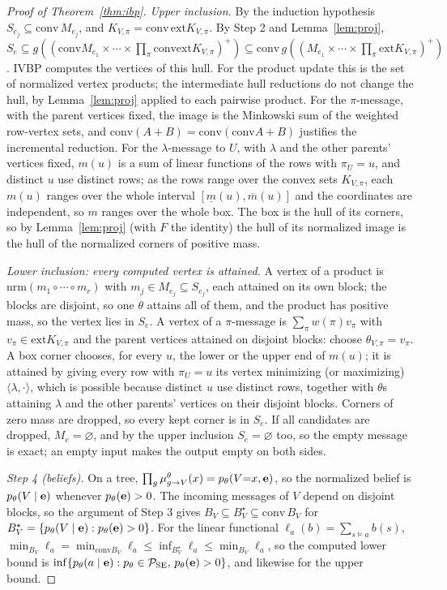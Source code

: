 \documentclass{article} %
\newcommand{\ext}{\mathrm{ext}}
\begin{document}
\begin{proof}[Proof of Theorem~\ref{thm:ibp}]
\emph{Upper inclusion.} By the induction hypothesis $S_{e_j}\subseteq\mathrm{conv}\,M_{e_j}$,
and $K_{V,\pi}=\mathrm{conv}\,\ext K_{V,\pi}$. By Step 2 and Lemma~\ref{lem:proj},
$S_e\subseteq g((\mathrm{conv}M_{e_1}\times\cdots\times\prod_\pi\mathrm{conv}\ext
K_{V,\pi})^+)\subseteq\mathrm{conv}\,g((M_{e_1}\times\cdots\times\prod_\pi\ext K_{V,\pi})^+)$.
IVBP computes the vertices of this hull. For the product update this is the set of
normalized vertex products; the intermediate hull reductions do not change the hull, by
Lemma~\ref{lem:proj} applied to each pairwise product. For the $\pi$-message, with the
parent vertices fixed, the image is the Minkowski sum of the weighted row-vertex sets, and
$\mathrm{conv}(A+B)=\mathrm{conv}(\mathrm{conv}A+B)$ justifies the incremental reduction. For
the $\lambda$-message to $U$, with $\lambda$ and the other parents' vertices fixed, $m(u)$ is
a sum of linear functions of the rows with $\pi_U=u$, and distinct $u$ use distinct rows; as
the rows range over the convex sets $K_{V,\pi}$, each $m(u)$ ranges over the whole interval
$[\underline m(u),\overline m(u)]$ and the coordinates are independent, so $m$ ranges over
the whole box. The box is the hull of its corners, so by Lemma~\ref{lem:proj} (with $F$ the
identity) the hull of its normalized image is the hull of the normalized corners of positive
mass.

\emph{Lower inclusion: every computed vertex is attained.} A vertex of a product is
$\mathrm{nrm}(m_1\circ\cdots\circ m_r)$ with $m_j\in M_{e_j}\subseteq S_{e_j}$, each attained on
its own block; the blocks are disjoint, so one $\theta$ attains all of them, and the product
has positive mass, so the vertex lies in $S_e$. A vertex of a $\pi$-message is
$\sum_\pi w(\pi)v_\pi$ with $v_\pi\in\ext K_{V,\pi}$ and the parent vertices attained on
disjoint blocks: choose $\theta_{V,\pi}=v_\pi$. A box corner chooses, for every $u$, the lower
or the upper end of $m(u)$; it is attained by giving every row with $\pi_U=u$ its vertex
minimizing (or maximizing) $\langle\lambda,\cdot\rangle$, which is possible because distinct
$u$ use distinct rows, together with $\theta$s attaining $\lambda$ and the other parents'
vertices on their disjoint blocks. Corners of zero mass are dropped, so every kept corner is
in $S_e$. If all candidates are dropped, $M_e=\varnothing$, and by the upper inclusion
$S_e=\varnothing$ too, so the empty message is exact; an empty input makes the output empty
on both sides.

\emph{Step 4 (beliefs).} On a tree, $\prod_g\mu^\theta_{g\to V}(x)=p_\theta(V{=}x,\mathbf{e})$, so
the normalized belief is $p_\theta(V\mid\mathbf{e})$ whenever $p_\theta(\mathbf{e})>0$. The incoming
messages of $V$ depend on disjoint blocks, so the argument of Step 3 gives
$B_V\subseteq B^\star_V\subseteq\mathrm{conv}\,B_V$ for
$B^\star_V=\{p_\theta(V\mid\mathbf{e}):p_\theta(\mathbf{e})>0\}$. For the linear functional
$\ell_a(b)=\sum_{s\models a}b(s)$,
$\min_{B_V}\ell_a=\min_{\mathrm{conv}B_V}\ell_a\le\inf_{B^\star_V}\ell_a\le\min_{B_V}\ell_a$,
so the computed lower bound is $\inf\{p_\theta(a\mid\mathbf{e}):p_\theta\in\mathcal
P_{\mathrm{SE}},\,p_\theta(\mathbf{e})>0\}$, and likewise for the upper bound.


\end{proof}
\end{document}
